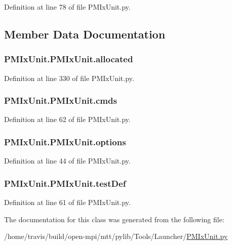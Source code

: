 Definition at line 78 of file P\-M\-Ix\-Unit.\-py.



\subsection{Member Data Documentation}
\hypertarget{class_p_m_ix_unit_1_1_p_m_ix_unit_ac5aab2d0bc98a044527305f1dfee7282}{
\subsubsection[{allocated}]{\setlength{\rightskip}{0pt plus 5cm}P\-M\-Ix\-Unit.\-P\-M\-Ix\-Unit.\-allocated}}\label{class_p_m_ix_unit_1_1_p_m_ix_unit_ac5aab2d0bc98a044527305f1dfee7282}


Definition at line 330 of file P\-M\-Ix\-Unit.\-py.

\hypertarget{class_p_m_ix_unit_1_1_p_m_ix_unit_a1130f07074aeff223235a147440868c4}{
\subsubsection[{cmds}]{\setlength{\rightskip}{0pt plus 5cm}P\-M\-Ix\-Unit.\-P\-M\-Ix\-Unit.\-cmds}}\label{class_p_m_ix_unit_1_1_p_m_ix_unit_a1130f07074aeff223235a147440868c4}


Definition at line 62 of file P\-M\-Ix\-Unit.\-py.

\hypertarget{class_p_m_ix_unit_1_1_p_m_ix_unit_a6c56979e7226a414874653b3e7a17dd8}{
\subsubsection[{options}]{\setlength{\rightskip}{0pt plus 5cm}P\-M\-Ix\-Unit.\-P\-M\-Ix\-Unit.\-options}}\label{class_p_m_ix_unit_1_1_p_m_ix_unit_a6c56979e7226a414874653b3e7a17dd8}


Definition at line 44 of file P\-M\-Ix\-Unit.\-py.

\hypertarget{class_p_m_ix_unit_1_1_p_m_ix_unit_a08b01eaf2867a0a02f8598018739e843}{
\subsubsection[{test\-Def}]{\setlength{\rightskip}{0pt plus 5cm}P\-M\-Ix\-Unit.\-P\-M\-Ix\-Unit.\-test\-Def}}\label{class_p_m_ix_unit_1_1_p_m_ix_unit_a08b01eaf2867a0a02f8598018739e843}


Definition at line 61 of file P\-M\-Ix\-Unit.\-py.



The documentation for this class was generated from the following file\-:\begin{DoxyCompactItemize}
\item 
/home/travis/build/open-\/mpi/mtt/pylib/\-Tools/\-Launcher/\hyperlink{_p_m_ix_unit_8py}{P\-M\-Ix\-Unit.\-py}\end{DoxyCompactItemize}

